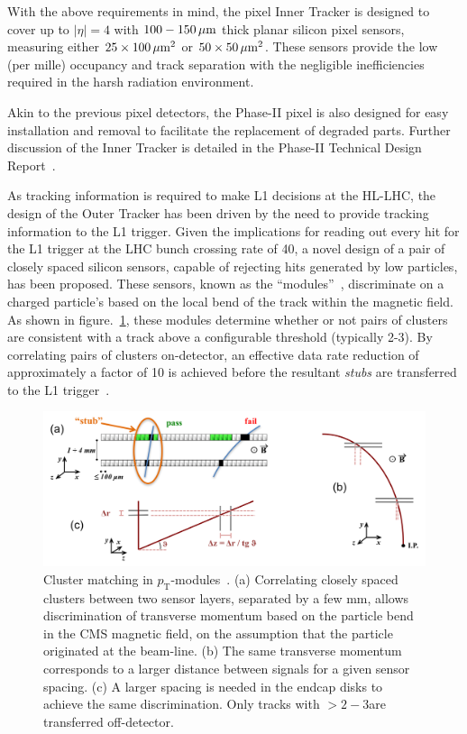 With the above requirements in mind, the pixel Inner Tracker is designed to cover up to $|\eta| = 4$ with $100-150\,\mu\text{m}$ thick planar silicon pixel sensors, measuring either $25\times100\,\mu\text{m}^{2}$ or $50\times50\,\mu\text{m}^{2}$.
These sensors provide the low (per mille) occupancy and track separation with the negligible inefficiencies required in the harsh radiation environment.

Akin to the previous pixel detectors, the Phase-II pixel is also designed for easy installation and removal to facilitate the replacement of degraded parts.
Further discussion of the Inner Tracker is detailed in the Phase-II Technical Design Report~\cite{P2TrackerTDR}.

As tracking information is required to make L1 decisions at the HL-LHC, the design of the Outer Tracker has been driven by the need to provide tracking information to the L1 trigger.
Given the implications for reading out every hit for the L1 trigger at the LHC bunch crossing rate of 40\MHz, a novel design of a pair of closely spaced silicon sensors, capable of rejecting hits generated by low \pT particles, has been proposed.
These sensors, known as the ``\pT modules''~\cite{jjonespixel,markthesis}, discriminate on a charged particle's \pT based on the local bend of the track within the magnetic field.
As shown in figure.~\ref{fig:stubs}, these modules determine whether or not pairs of clusters are consistent with a track \pT above a configurable threshold (typically 2-3\GeV).
By correlating pairs of clusters on-detector, an effective data rate reduction of approximately a factor of 10 is achieved before the resultant \emph{stubs} are transferred to the L1 trigger~\cite{mpessimperf,2dptmoduleconcept}.

\begin{figure}[!t]
\centering
\includegraphics[width=5in]{figs/tk-upgrade/pTsketches.png}
\caption{Cluster matching in $p_\mathrm{T}$-modules~\cite{P2TrackerTDR}. (a) Correlating closely spaced clusters between two sensor layers, separated by a few mm, allows discrimination of transverse momentum based on the particle bend in the CMS magnetic field, on the assumption that the particle originated at the beam-line. (b) The same transverse momentum corresponds to a larger distance between signals for a given sensor spacing. (c) A larger spacing is needed in the endcap disks to achieve the same discrimination. Only tracks with \pT $> 2-3$\GeVc are transferred off-detector.
}
\label{fig:stubs}
\end{figure}

